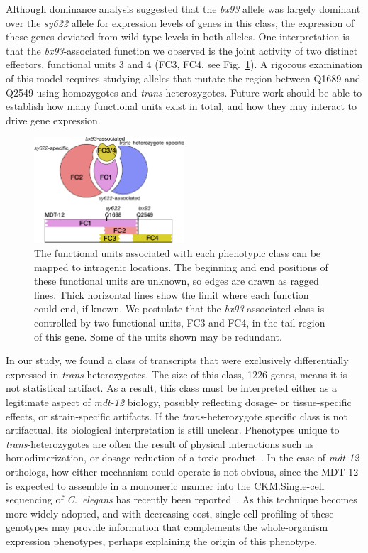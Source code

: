 \documentclass[8pt, twocolumn]{article}
\newcommand{\cel}{\emph{C.~elegans}}
\newcommand{\gene}[1]{\mbox{\emph{#1}}}
\newcommand{\protein}[1]{\mbox{\uppercase{#1}}}
\newcommand{\dpy}{\gene{mdt-12}}
\begin{document}
Although dominance analysis suggested that the \emph{bx93} allele was largely
dominant over the \emph{sy622} allele for expression levels of genes in this
class, the expression of these genes deviated from wild-type levels in both
alleles. One interpretation is that the \emph{bx93}-associated function we
observed is the joint activity of two distinct effectors, functional units 3 and
4 (FC3, FC4, see Fig.~\ref{fig:domains}). A rigorous examination of this model
requires studying alleles that mutate the region between Q1689 and Q2549 using
homozygotes and \emph{trans}-heterozygotes. Future work should be able to
establish how many functional units exist in total, and how they may interact to
drive gene expression.

\begin{figure}
  \centering{}
  \includegraphics[width=0.5\textwidth]{../../figs/inferred_domains.pdf}
  \caption{
    The functional units associated with each phenotypic class can be
    mapped to intragenic locations. The beginning and end positions of
    these functional units are unknown,
    so edges are drawn as ragged lines. Thick horizontal lines show the
    limit where each function could end, if known. We postulate that the
    \emph{bx93}-associated class is controlled by two functional units, FC3 and
    FC4, in the tail region of this gene. Some of the units shown may be
    redundant.
  }
\label{fig:domains}
\end{figure}

In our study, we found a class of transcripts that were exclusively
differentially expressed in \emph{trans}-heterozygotes. The size of this class,
1226 genes, means it is not statistical artifact. As a result, this class
must be interpreted either as a legitimate aspect of \dpy{} biology, possibly
reflecting dosage- or tissue-specific effects, or strain-specific artifacts.
If the \emph{trans}-heterozygote specific class is not artifactual, its
biological interpretation is still unclear.
Phenotypes unique to \emph{trans}-heterozygotes are often the result of physical
interactions such as homodimerization, or dosage reduction of a toxic
product~\cite{Yook2005}. In the case of \dpy{} orthologs, how either mechanism
could operate is not obvious, since the \protein{mdt-12} is expected to assemble
in a monomeric manner into the CKM.\@ Single-cell sequencing of \cel{} has
recently been reported~\cite{Cao2017}. As this technique becomes more widely
adopted, and with decreasing cost, single-cell profiling of these genotypes may
provide information that complements the whole-organism expression phenotypes,
perhaps explaining the origin of this phenotype.
\end{document}

